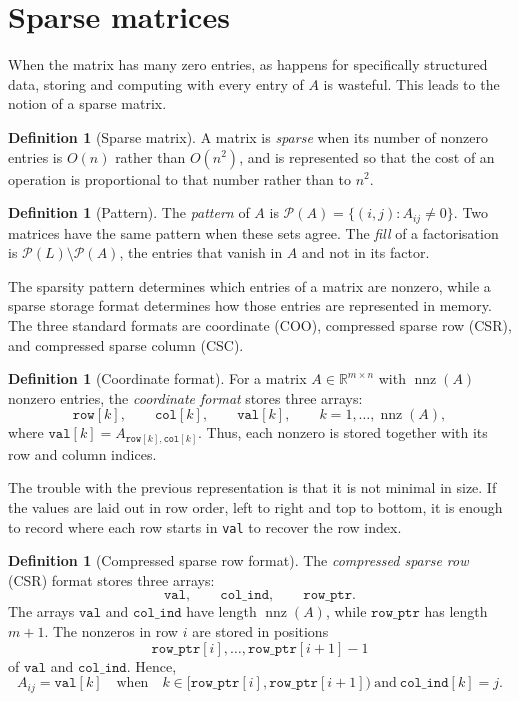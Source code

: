 \documentclass[a4paper,11pt]{book}
\theoremstyle{plain}
\theoremstyle{definition}
\newtheorem{definition}[theorem]{Definition}
\theoremstyle{remark}
\numberwithin{equation}{chapter}
\numberwithin{algorithm}{chapter}
\begin{document}
	\section{Sparse matrices}
	
	When the matrix has many zero entries, as happens for specifically structured
	data, storing and computing with every entry of $A$ is wasteful. This leads to
	the notion of a sparse matrix.
	

	\begin{definition}[Sparse matrix]
		A matrix is \emph{sparse} when its number of nonzero entries is $O(n)$ rather
		than $O(n^2)$, and is represented so that the cost of an operation is
		proportional to that number rather than to $n^2$.
	\end{definition}
	
	\begin{definition}[Pattern]
		The \emph{pattern} of $A$ is $\mathcal{P}(A)=\{(i,j):A_{ij}\neq0\}$. Two
		matrices have the same pattern when these sets agree. The \emph{fill} of a
		factorisation is $\mathcal{P}(L)\setminus\mathcal{P}(A)$, the entries that
		vanish in $A$ and not in its factor.
	\end{definition}
	
	
	The sparsity pattern determines which entries of a matrix are nonzero, while a
	sparse storage format determines how those entries are represented in memory.
	The three standard formats are coordinate (COO), compressed sparse row (CSR),
	and compressed sparse column (CSC).
	
	\begin{definition}[Coordinate format]
		For a matrix $A\in\mathbb{R}^{m\times n}$ with $\operatorname{nnz}(A)$
		nonzero entries, the \emph{coordinate format} stores three arrays:
		\[
		\texttt{row}[k],\qquad \texttt{col}[k],\qquad \texttt{val}[k],
		\qquad k=1,\dots,\operatorname{nnz}(A),
		\]
		where $\texttt{val}[k]=A_{\texttt{row}[k],\texttt{col}[k]}$. Thus, each
		nonzero is stored together with its row and column indices.
	\end{definition}
	
	The trouble with the previous representation is that it is not minimal in
	size. If the values are laid out in row order, left to right and top to bottom,
	it is enough to record where each row starts in \texttt{val} to recover the row
	index.
	
	\begin{definition}[Compressed sparse row format]
		The \emph{compressed sparse row} (CSR) format stores three arrays:
		\[
		\texttt{val},\qquad \texttt{col\_ind},\qquad \texttt{row\_ptr}.
		\]
		The arrays $\texttt{val}$ and $\texttt{col\_ind}$ have length
		$\operatorname{nnz}(A)$, while $\texttt{row\_ptr}$ has length $m+1$. The
		nonzeros in row $i$ are stored in positions
		\[
		\texttt{row\_ptr}[i],\dots,\texttt{row\_ptr}[i+1]-1
		\]
		of $\texttt{val}$ and $\texttt{col\_ind}$. Hence,
		\[
		A_{ij}=\texttt{val}[k]
		\quad\text{when}\quad
		k\in[\texttt{row\_ptr}[i],\texttt{row\_ptr}[i+1])
		\ \text{and}\ 
		\texttt{col\_ind}[k]=j.
		\]
	\end{definition}
	
\end{document}
